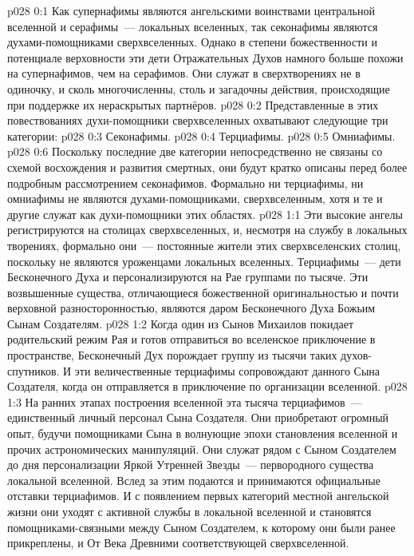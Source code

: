 \author{Могущественный Посланник}
\vs p028 0:1 Как супернафимы являются ангельскими воинствами центральной вселенной и серафимы~--- локальных вселенных, так секонафимы являются духами\hyp{}помощниками сверхвселенных. Однако в степени божественности и потенциале верховности эти дети Отражательных Духов намного больше похожи на супернафимов, чем на серафимов. Они служат в сверхтворениях не в одиночку, и сколь многочисленны, столь и загадочны действия, происходящие при поддержке их нераскрытых партнёров.
\vs p028 0:2 \pc Представленные в этих повествованиях духи\hyp{}помощники сверхвселенных охватывают следующие три категории:
\vs p028 0:3 Секонафимы.
\vs p028 0:4 Терциафимы.
\vs p028 0:5 Омниафимы.
\vs p028 0:6 \pc Поскольку последние две категории непосредственно не связаны со схемой восхождения и развития смертных, они будут кратко описаны перед более подробным рассмотрением секонафимов. Формально ни терциафимы, ни омниафимы не являются духами\hyp{}помощниками,  сверхвселенным, хотя и те и другие служат как духи\hyp{}помощники  этих областях.
\vs p028 1:1 Эти высокие ангелы регистрируются на столицах сверхвселенных, и, несмотря на службу в локальных творениях, формально они~--- постоянные жители этих сверхвселенских столиц, поскольку не являются уроженцами локальных вселенных. Терциафимы~--- дети Бесконечного Духа и персонализируются на Рае группами по тысяче. Эти возвышенные существа, отличающиеся божественной оригинальностью и почти верховной разносторонностью, являются даром Бесконечного Духа Божьим Сынам Создателям.
\vs p028 1:2 Когда один из Сынов Михаилов покидает родительский режим Рая и готов отправиться во вселенское приключение в пространстве, Бесконечный Дух порождает группу из тысячи таких духов\hyp{}спутников. И эти величественные терциафимы сопровождают данного Сына Создателя, когда он отправляется в приключение по организации вселенной.
\vs p028 1:3 На ранних этапах построения вселенной эта тысяча терциафимов~--- единственный личный персонал Сына Создателя. Они приобретают огромный опыт, будучи помощниками Сына в волнующие эпохи становления вселенной и прочих астрономических манипуляций. Они служат рядом с Сыном Создателем до дня персонализации Яркой Утренней Звезды~--- первородного существа локальной вселенной. Вслед за этим подаются и принимаются официальные отставки терциафимов. И с появлением первых категорий местной ангельской жизни они уходят с активной службы в локальной вселенной и становятся помощниками\hyp{}связными между Сыном Создателем, к которому они были ранее прикреплены, и От Века Древними соответствующей сверхвселенной.

